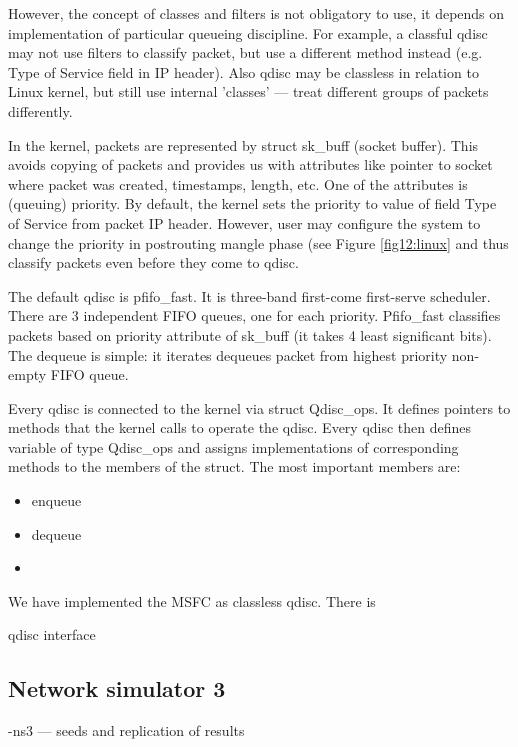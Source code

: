 However, the concept of classes and filters is not obligatory to use, it depends on implementation of particular queueing discipline. For example, a classful qdisc may not use filters to classify packet, but use a different method instead (e.g. Type of Service field in IP header). Also qdisc may be classless in relation to Linux kernel, but still use internal 'classes' --- treat different groups of packets differently.

In the kernel, packets are represented by struct sk\_buff (socket buffer). This avoids copying of packets and provides us with attributes like pointer to socket where packet was created, timestamps, length, etc. One of the attributes is (queuing) priority. By default, the kernel sets the priority to value of field Type of Service from packet IP header. However, user may configure the system to change the priority in postrouting mangle phase (see Figure \ref{fig12:linux} and thus classify packets even before they come to qdisc.

The default qdisc is pfifo\_fast. It is three-band first-come first-serve scheduler. There are 3 independent FIFO queues, one for each priority. Pfifo\_fast classifies packets based on priority attribute of sk\_buff (it takes 4 least significant bits). The dequeue is simple: it iterates dequeues packet from highest priority non-empty FIFO queue.

Every qdisc is connected to the kernel via struct Qdisc\_ops. It defines pointers to methods that the kernel calls to operate the qdisc. Every qdisc then defines variable of type Qdisc\_ops and assigns implementations of corresponding methods to the members of the struct. The most important members are:



\begin{itemize}
	\item enqueue
	\item dequeue
	\item 
\end{itemize}

We have implemented the MSFC as classless qdisc. There is 

qdisc interface

\subsection {Network simulator 3}

-ns3 --- seeds and replication of results


